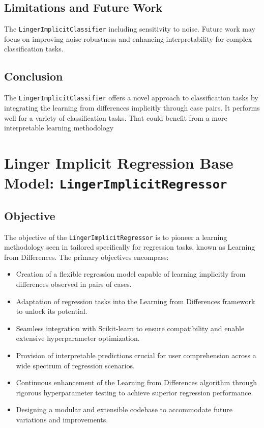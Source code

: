 \documentclass[a4paper, 12pt]{report}
\begin{document}
\subsection{Limitations and Future Work}
The \texttt{LingerImplicitClassifier} including sensitivity to noise.
Future work may focus on improving noise robustness and enhancing interpretability for complex classification tasks.

\subsection{Conclusion}
The \texttt{LingerImplicitClassifier} offers a novel approach to classification tasks by integrating the learning from differences implicitly through case pairs. 
It performs well for a variety of classification tasks. 
That could benefit from a more interpretable learning methodology 

\section{Linger Implicit Regression Base Model: \texttt{LingerImplicitRegressor}}

\subsection{Objective}
The objective of the \texttt{LingerImplicitRegressor} is to pioneer a learning methodology seen in \cite{ye2021learning} tailored specifically for regression tasks, known as Learning from Differences. The primary objectives encompass:

\begin{itemize}
\item Creation of a flexible regression model capable of learning implicitly from differences observed in pairs of cases.
\item Adaptation of regression tasks into the Learning from Differences framework to unlock its potential.
\item Seamless integration with Scikit-learn to ensure compatibility and enable extensive hyperparameter optimization.
\item Provision of interpretable predictions crucial for user comprehension across a wide spectrum of regression scenarios.
\item Continuous enhancement of the Learning from Differences algorithm through rigorous hyperparameter testing to achieve superior regression performance.
\item Designing a modular and extensible codebase to accommodate future variations and improvements.
\end{itemize}
\end{document}
